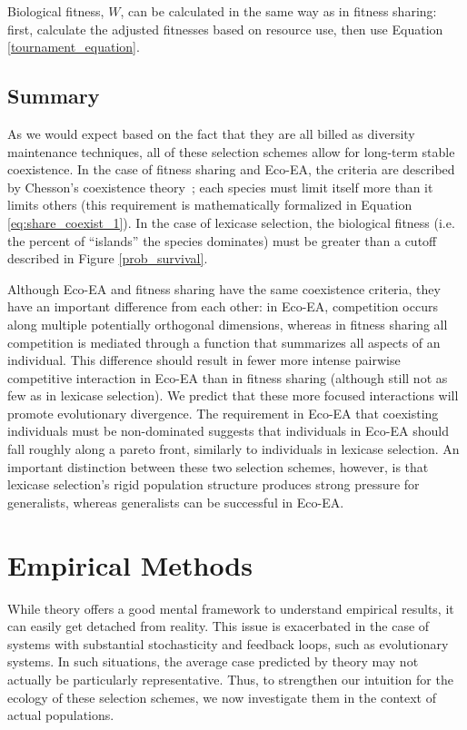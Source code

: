 Biological fitness, $W$, can be calculated in the same way as in fitness sharing: first, calculate the adjusted fitnesses based on resource use, then use Equation \ref{tournament_equation}. 

\subsection{Summary}

As we would expect based on the fact that they are all billed as diversity maintenance techniques, all of these selection schemes allow for long-term stable coexistence. In the case of fitness sharing and Eco-EA, the criteria are described by Chesson's coexistence theory~\cite{chesson_mechanisms_2000}; each species must limit itself more than it limits others (this requirement is mathematically formalized in Equation \ref{eq:share_coexist_1}). In the case of lexicase selection, the biological fitness (i.e. the percent of ``islands'' the species dominates) must be greater than a cutoff described in Figure \ref{prob_survival}.

Although Eco-EA and fitness sharing have the same coexistence criteria, they have an important difference from each other: in Eco-EA, competition occurs along multiple potentially orthogonal dimensions, whereas in fitness sharing all competition is mediated through a function that summarizes all aspects of an individual. This difference should result in fewer more intense pairwise competitive interaction in Eco-EA than in fitness sharing (although still not as few as in lexicase selection). We predict that these more focused interactions will promote evolutionary divergence. The requirement in Eco-EA that coexisting individuals must be non-dominated suggests that individuals in Eco-EA should fall roughly along a pareto front, similarly to individuals in lexicase selection. An important distinction between these two selection schemes, however, is that lexicase selection's rigid population structure produces strong pressure for generalists, whereas generalists can be successful in Eco-EA.

\section{Empirical Methods}

While theory offers a good mental framework to understand empirical results, it can easily get detached from reality. This issue is exacerbated in the case of systems with substantial stochasticity and feedback loops, such as evolutionary systems. In such situations, the average case predicted by theory may not actually be particularly representative. Thus, to strengthen our intuition for the ecology of these selection schemes, we now investigate them in the context of actual populations. 

